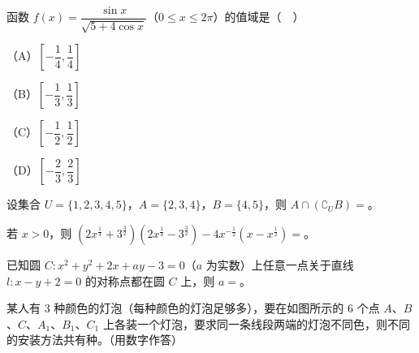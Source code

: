 \begin{question}
函数 $f(x)=\dfrac{\sin x}{\sqrt{5+4\cos x}}$（$0\leqslant x\leqslant2\pi$）的值域是（　）

（A）$\left[-\dfrac14,\dfrac14\right]$

（B）$\left[-\dfrac13,\dfrac13\right]$

（C）$\left[-\dfrac12,\dfrac12\right]$

（D）$\left[-\dfrac23,\dfrac23\right]$

\end{question}

\begin{question}
设集合 $U=\{1,2,3,4,5\}$，$A=\{2,3,4\}$，$B=\{4,5\}$，则 $A\cap(\complement_UB)=$\gkblank{}。

\end{question}
\begin{question}
若 $x>0$，则 $\left(2x^{\frac14}+3^{\frac32}\right)\left(2x^{\frac14}-3^{\frac32}\right)-4x^{-\frac12}\left(x-x^{\frac12}\right)=$\gkblank{}。

\end{question}
\begin{question}
已知圆 $C:x^2+y^2+2x+ay-3=0$（$a$ 为实数）上任意一点关于直线 $l:x-y+2=0$ 的对称点都在圆 $C$ 上，则 $a=$\gkblank{}。

\Needspace{0.4\textheight}
\end{question}
\begin{question}
某人有 $3$ 种颜色的灯泡（每种颜色的灯泡足够多），要在如图所示的 $6$ 个点 $A$、$B$、$C$、$A_1$、$B_1$、$C_1$ 上各装一个灯泡，要求同一条线段两端的灯泡不同色，则不同的安装方法共有\gkblank{}种。（用数字作答）
\nopagebreak[4]
\begin{center}\end{center}
\nopagebreak[4]
\end{question}

